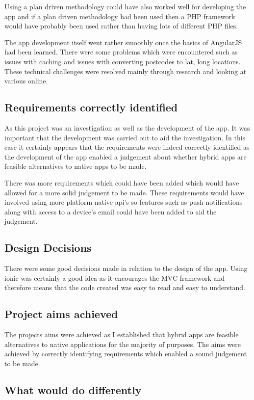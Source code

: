 Using a plan driven methodology could have also worked well for developing the app and if a plan driven methodology had been used then a PHP framework would have probably been used rather than having lots of different PHP files. 


The app development itself went rather smoothly once the basics of AngularJS had been learned. There were some problems which were encountered such as issues with caching and issues with converting postcodes to lat, long locations. These technical challenges were resolved mainly through research and looking at various online.      
\subsection{Requirements correctly identified}
As this project was an investigation as well as the development of the app. It was important that the development was carried out to aid the investigation. In this case it certainly appears that the requirements were indeed correctly identified as the development of the app enabled a judgement about whether hybrid apps are feasible alternatives to native apps to be made.

There was more requirements which could have been added which would have allowed for a more solid judgement to be made. These requirements would have involved using more platform native api's so features such as push notifications along with access to a device's email could have been added to aid the judgement.
\subsection{Design Decisions}
There were some good decisions made in relation to the design of the app. Using ionic was certainly a good idea as it encourages the MVC framework and therefore means that the code created was easy to read and easy to understand. 
\subsection{Project aims achieved}
The projects aims were achieved as I established that hybrid apps are feasible alternatives to native applications for the majority of purposes. The aims were achieved by correctly identifying requirements which enabled a sound judgement to be made.
\subsection{What would do differently}


